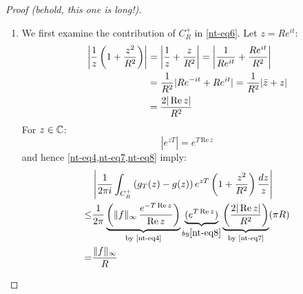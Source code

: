 \documentclass[12pt]{article}
\begin{document}
\begin{proof}[Proof (behold, this one is long!)]
\begin{enumerate}[align=left, label=\textit{Step \arabic*:}]
    \item We first examine the contribution of $C_{R}^{+}$ in \cref{nt-eq6}. Let $z=Re^{it}$: \begin{equation}\label{nt-eq7}
        \begin{aligned}
            \left|{\frac{1}{z}}\left(1+{\frac{z^{2}}{R^{2}}}\right)\right|&=\left|{\frac{1}{z}}+{\frac{z}{R^{2}}}\right|=\left|{\frac{1}{R e^{i t}}}+{\frac{R e^{i t}}{R^{2}}}\right|\\ 
            &={\frac{1}{R^{2}}}|R e^{-i t}+R e^{i t}|={\frac{1}{R^{2}}}|\bar{z}+z|\\ 
            &={\frac{2|\operatorname{Re} z|}{R^{2}}}
        \end{aligned}
    \end{equation}
    For $z\in \mathbb{C}$: \begin{equation}\label{nt-eq8}
        |e^{z T}|= e^{T\,\mathrm{Re}\,z}
    \end{equation}
    and hence \cref{nt-eq4,nt-eq7,nt-eq8} imply: 
    \begin{equation}\label{nt-eq9}
        \begin{aligned}
           &\left|\frac{1}{2\pi i}\int_{C_{R}^{+}}\left(g_{T}(z)-g(z)\right)e^{z T}\left(1+\frac{z^{2}}{R^{2}}\right)\frac{d z}{z}\right|\\
    \leq&\frac{1}{2\pi}\underbrace{\left(\|f\|_{\infty}\,\frac{e^{-T\operatorname{Re} z}}{\operatorname{Re} z}\right)}_{\text{by \ref{nt-eq4}}}\underbrace{(e^{T\operatorname{Re} z})}_{by \ref{nt-eq8}}\underbrace{\left(\frac{2 |\operatorname{Re} z|}{R^{2}}\right)}_{\text{by \ref{nt-eq7}}}(\pi R)\\
    =&\frac{\|f\|_{\infty}}{R} 
        \end{aligned}
    \end{equation}


\end{enumerate}
\end{proof}
\end{document}
